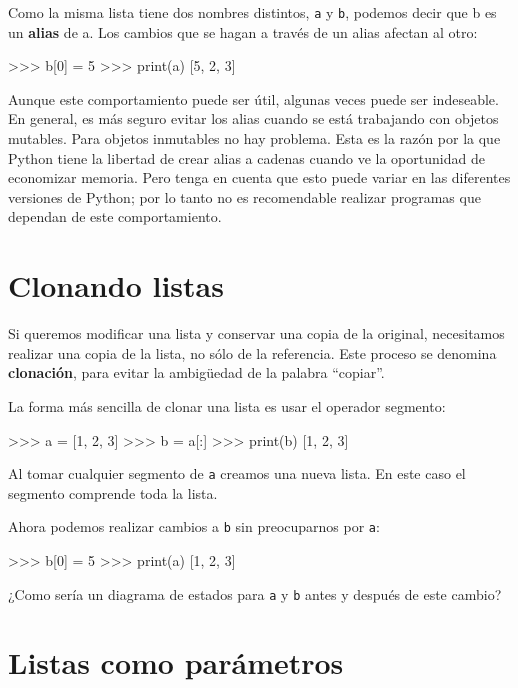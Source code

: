 Como la misma lista tiene dos nombres distintos, \texttt{a} y \texttt{b},
podemos decir que b es un \textbf{alias} de a. Los cambios que se
hagan a través de un alias afectan al otro:
\begin{pyconcode}
>>> b[0] = 5
>>> print(a)
[5, 2, 3]
\end{pyconcode}

Aunque este comportamiento puede ser útil, algunas veces puede ser
indeseable. En general, es más seguro evitar los alias cuando se está
trabajando con objetos mutables. Para objetos inmutables no hay problema.
Esta es la razón por la que Python tiene la libertad de crear alias
a cadenas cuando ve la oportunidad de economizar memoria. Pero tenga
en cuenta que esto puede variar en las diferentes versiones de Python;
por lo tanto no es recomendable realizar programas que dependan de
este comportamiento.

\section{Clonando listas}

 

Si queremos modificar una lista y conservar una copia de la original,
necesitamos realizar una copia de la lista, no sólo de la referencia.
Este proceso se denomina \textbf{clonación}, para evitar la ambigüedad
de la palabra ``copiar''.

La forma más sencilla de clonar una lista es usar el operador segmento:
\begin{pyconcode}
>>> a = [1, 2, 3]
>>> b = a[:]
>>> print(b)
[1, 2, 3]
\end{pyconcode}

Al tomar cualquier segmento de \texttt{a} creamos una nueva lista.
En este caso el segmento comprende toda la lista.

Ahora podemos realizar cambios a \texttt{b} sin preocuparnos por \texttt{a}:
\begin{pyconcode}
>>> b[0] = 5
>>> print(a)
[1, 2, 3]
\end{pyconcode}

¿Como sería un diagrama de estados para \texttt{a} y \texttt{b} antes
y después de este cambio? 

\section{Listas como parámetros}

  

